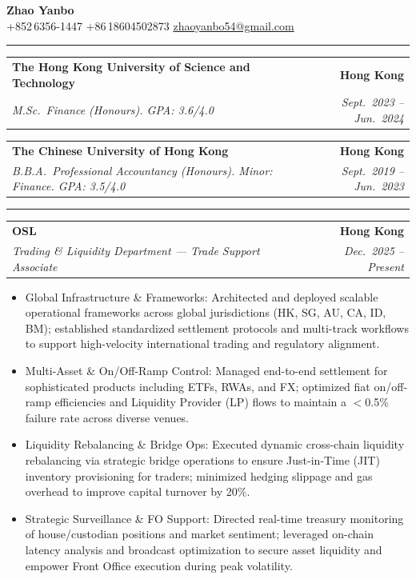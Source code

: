 \documentclass[9pt,a4paper]{article}
\makeatletter
\newcommand{\ressection}[1]{%
  \vspace{0.8em}%
  \noindent{\large\scshape\bfseries #1}\par\nobreak
  \vspace{-\parskip}%
  \vspace{-\parskip}%
  \vspace{-\parskip}%
  \vspace{-\parskip}%
  \noindent\rule{\linewidth}{0.1pt}\par\nobreak
  \vspace{-\parskip}%
}
\newcommand{\resumeSubheading}[4]{%
  \vspace{0.6em}%
  \begin{tabular*}{\textwidth}{l@{\extracolsep{\fill}}r}
    \textbf{#1} & \textbf{#2} \\
    \textit{\small #3} & \textit{\small #4} \\
  \end{tabular*}\vspace{0.32em}}
\makeatother
\begin{document}
\begin{center}
  {\LARGE\bfseries Zhao Yanbo}\\[0.35em]
  \small
  +852\,6356-1447 \;\textbar\;
  +86\,18604502873 \;\textbar\;
  \href{mailto:zhaoyanbo54@gmail.com}{zhaoyanbo54@gmail.com}
\end{center}
\vspace{-0.2em}

\ressection{Education}

\resumeSubheading{The Hong Kong University of Science and Technology}{Hong Kong}{M.Sc.\ Finance (Honours). GPA: 3.6/4.0}{Sept.\ 2023 -- Jun.\ 2024}

\resumeSubheading{The Chinese University of Hong Kong}{Hong Kong}{B.B.A.\ Professional Accountancy (Honours). Minor: Finance. GPA: 3.5/4.0}{Sept.\ 2019 -- Jun.\ 2023}

\ressection{Work Experience}

\resumeSubheading{OSL}{Hong Kong}{Trading \& Liquidity Department --- Trade Support Associate}{Dec.\ 2025 -- Present}
\begin{itemize}
  \item Global Infrastructure \& Frameworks: Architected and deployed scalable operational frameworks across global jurisdictions (HK, SG, AU, CA, ID, BM); established standardized settlement protocols and multi-track workflows to support high-velocity international trading and regulatory alignment.
  \item Multi-Asset \& On/Off-Ramp Control: Managed end-to-end settlement for sophisticated products including ETFs, RWAs, and FX; optimized fiat on/off-ramp efficiencies and Liquidity Provider (LP) flows to maintain a $<$0.5\% failure rate across diverse venues.
  \item Liquidity Rebalancing \& Bridge Ops: Executed dynamic cross-chain liquidity rebalancing via strategic bridge operations to ensure Just-in-Time (JIT) inventory provisioning for traders; minimized hedging slippage and gas overhead to improve capital turnover by 20\%.
  \item Strategic Surveillance \& FO Support: Directed real-time treasury monitoring of house/custodian positions and market sentiment; leveraged on-chain latency analysis and broadcast optimization to secure asset liquidity and empower Front Office execution during peak volatility.
\end{itemize}
\end{document}
